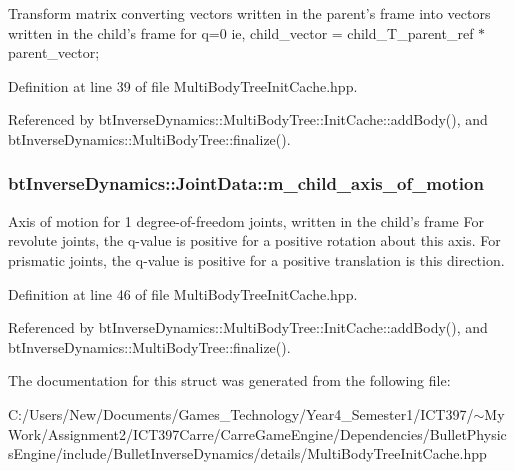 Transform matrix converting vectors written in the parent's frame into vectors written in the child's frame for q=0 ie, child\_\-vector = child\_\-T\_\-parent\_\-ref $\ast$ parent\_\-vector; 

Definition at line 39 of file MultiBodyTreeInitCache.hpp.

Referenced by btInverseDynamics::MultiBodyTree::InitCache::addBody(), and btInverseDynamics::MultiBodyTree::finalize().\hypertarget{structbt_inverse_dynamics_1_1_joint_data_e237c62f233031b18eec950090a1f576}{
\subsubsection[m\_\-child\_\-axis\_\-of\_\-motion]{ {\bf btInverseDynamics::JointData::m\_\-child\_\-axis\_\-of\_\-motion}}}
\label{structbt_inverse_dynamics_1_1_joint_data_e237c62f233031b18eec950090a1f576}


Axis of motion for 1 degree-of-freedom joints, written in the child's frame For revolute joints, the q-value is positive for a positive rotation about this axis. For prismatic joints, the q-value is positive for a positive translation is this direction. 

Definition at line 46 of file MultiBodyTreeInitCache.hpp.

Referenced by btInverseDynamics::MultiBodyTree::InitCache::addBody(), and btInverseDynamics::MultiBodyTree::finalize().

The documentation for this struct was generated from the following file:\begin{CompactItemize}
\item 
C:/Users/New/Documents/Games\_\-Technology/Year4\_\-Semester1/ICT397/$\sim$My Work/Assignment2/ICT397Carre/CarreGameEngine/Dependencies/BulletPhysicsEngine/include/BulletInverseDynamics/details/MultiBodyTreeInitCache.hpp\end{CompactItemize}
